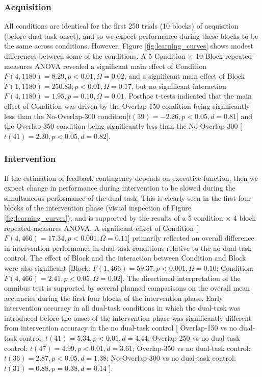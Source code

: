 \documentclass[apacite,draftfirst,man]{apa6}
\begin{document}
\subsubsection*{Acquisition}
All conditions are identical for the first 250 trials (10 blocks) of acquisition
(before dual-task onset), and so we expect performance during these blocks to be
the same across conditions. However, Figure \ref{fig:learning_curves} shows
modest differences between some of the conditions. A 5 Condition $\times$ 10
Block repeated-measures ANOVA revealed a significant main effect of Condition
$F(4,1180) = 8.29, p < 0.01, \Omega = 0.02$, and a significant main effect of
Block $F(1,1180) = 250.83, p < 0.01, \Omega = 0.17$, but no significant
interaction $F(4,1180) = 1.95, p = 0.10, \Omega = 0.01$. Posthoc t-tests
indicated that the main effect of Condition was driven by the Overlap-150
condition being significantly less than the No-Overlap-300 condition[$t(39) =
-2.26, p < 0.05, d = 0.81$] and the Overlap-350 condition being significantly
less than the No-Overlap-300 [$t(41) = 2.30, p < 0.05, d = 0.82$].

\subsubsection*{Intervention}
If the estimation of feedback contingency depends on executive function,
then we expect change in performance during intervention to be slowed during the
simultaneous performance of the dual task. This is clearly seen in the first
four blocks of the intervention phase (visual inspection of Figure
\ref{fig:learning_curves}), and is supported by the results of a 5 condition
$\times$ 4 block repeated-measures ANOVA. A significant effect of Condition
[$F(4,466) = 17.34, p < 0.001, \Omega = 0.11$] primarily reflected an overall
difference in intervention performance in dual-task conditions relative to the
no dual-task control. The effect of Block and the interaction between Condition
and Block were also significant [Block: $F(1,466) = 59.37, p < 0.001, \Omega =
0.10$; Condition: $F(4,466) = 2.41, p < 0.05, \Omega = 0.02$]. The directional
interpretation of the omnibus test is supported by several planned comparisons
on the overall mean accuracies during the first four blocks of the intervention
phase. Early intervention accuracy in all dual-task conditions in which
the dual-task was introduced before the onset of the intervention phase was
significantly different from intervention accuracy in the no dual-task control
[
Overlap-150 vs no dual-task control: $t(41) = 5.34, p < 0.01, d = 4.44$;
Overlap-250 vs no dual-task control: $t(47) = 4.99, p < 0.01, d = 3.61$;
Overlap-350 vs no dual-task control: $t(36) = 2.87, p < 0.05, d = 1.38$;
No-Overlap-300 vs no dual-task control: $t(31) = 0.88, p = 0.38, d = 0.14$ 
].
\end{document}
